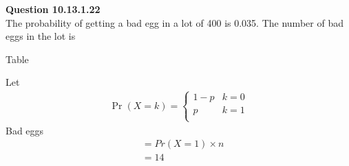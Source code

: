 \documentclass[journal,12pt,onecolumn]{IEEEtran}       \def\inputGnumericTable{}                                 %
\begin{document}
\let\pr\mathbf




\vspace{3cm}



\bigskip

\renewcommand{\thefigure}{\theenumi}
\renewcommand{\thetable}{\theenumi}


\textbf{Question 10.13.1.22}\\
The probability of getting a bad egg in a lot of 400 is 0.035. The number of bad eggs in the lot is
\solution
\fi
\begin{table}[!ht]
	
	\caption{Table}
	\label{tab:ncert/10/13/1/22/}	
\end{table}
Let 
\begin{align}
\Pr(X=k) = 
\begin{cases}
 1-p & k=0\\
p & k=1\\
\end{cases}
\end{align}	
Bad eggs
\begin{align}
&=Pr(X=1)\times{n}\\
&= 14
\end{align}   
\end{document}
